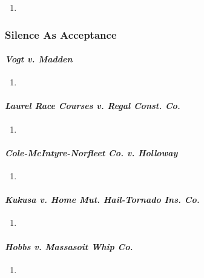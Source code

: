 \begin{enumerate}
    \item %
\end{enumerate}

\subsubsection{Silence As Acceptance}

\paragraph{\emph{Vogt v. Madden}}

\begin{enumerate}
    \item %
\end{enumerate}

\paragraph{\emph{Laurel Race Courses v. Regal Const. Co.}}

\begin{enumerate}
    \item %
\end{enumerate}

\paragraph{\emph{Cole-McIntyre-Norfleet Co. v. Holloway}}

\begin{enumerate}
    \item %
\end{enumerate}

\paragraph{\emph{Kukusa v. Home Mut. Hail-Tornado Ins. Co.}}

\begin{enumerate}
    \item %
\end{enumerate}

\paragraph{\emph{Hobbs v. Massasoit Whip Co.}}

\begin{enumerate}
    \item %
\end{enumerate}


